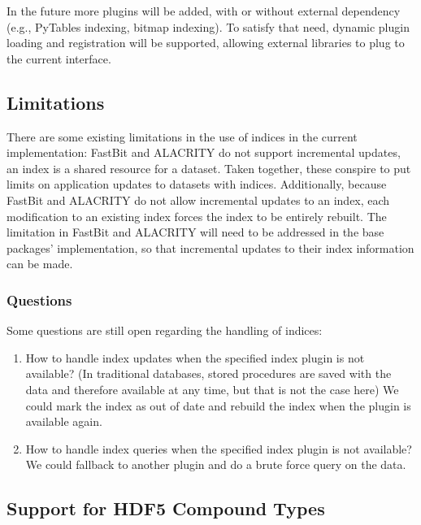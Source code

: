 \documentclass[letterpaper,hyper]{THG_RFC}
\begin{document}
In the future more plugins will be added, with or without external dependency
(e.g., PyTables indexing, bitmap indexing).
To satisfy that need, dynamic plugin loading and registration will be supported,
allowing external libraries to plug to the current interface.

\subsection{Limitations}

There are some existing limitations in the use of indices in the current
implementation: FastBit and ALACRITY do not support incremental updates,
an index is a shared resource for a dataset. Taken together, these conspire to
put limits on application updates to datasets with indices.
Additionally, because FastBit and ALACRITY do not allow incremental updates to
an index, each modification to an existing index forces the index to be entirely
rebuilt. The limitation in FastBit and ALACRITY will need to be addressed in
the base packages' implementation, so that incremental updates
to their index information can be made.

\subsubsection*{Questions}
Some questions are still open regarding the handling of indices:
\begin{enumerate}
\item How to handle index updates when the specified index plugin is not available?
(In traditional databases, stored procedures are saved with the data and
therefore available at any time, but that is not the case here)
We could mark the index as out of date and rebuild the index when the plugin is
available again.
\item How to handle index queries when the specified index plugin is not
available? We could fallback to another plugin and do a brute force query on the data.
\end{enumerate}

\subsection{Support for HDF5 Compound Types}
\end{document}
